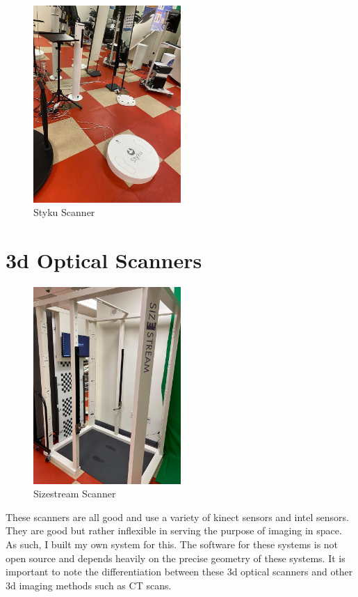 \begin{figure}[h]
	\caption{Styku Scanner}
	\centering
	\includegraphics[width=0.5\textwidth]{images/styku.jpg}
\end{figure}
\section{3d Optical Scanners}
\begin{figure}[h]
	\caption{Sizestream Scanner}
	\centering
	\includegraphics[width=0.5\textwidth]{images/sizestream.jpg}
\end{figure}

These scanners are all good and use a variety of kinect sensors and intel sensors.
They are good but rather inflexible in serving the purpose of imaging in space. As such, I built my own system for this. The software for these systems is not open source and depends heavily on the precise geometry of these systems. It is important to note the differentiation between these 3d optical scanners and other 3d imaging methods such as CT scans.

